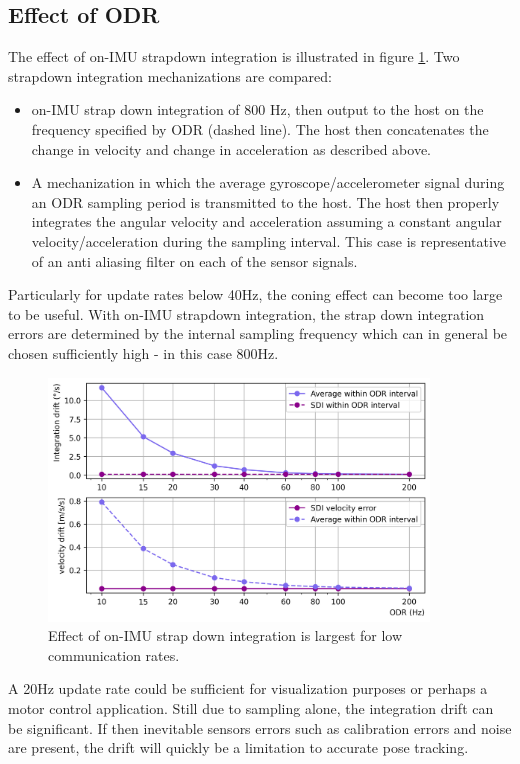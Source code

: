 \documentclass{article}
\begin{document}
\subsection{Effect of ODR}
The effect of on-IMU strapdown integration is illustrated in figure \ref{fig:effect_of_odr}. Two strapdown integration mechanizations are compared:
\begin{itemize}
\item on-IMU strap down integration of 800 Hz, then output to the host on the frequency specified by ODR (dashed line). The host then concatenates the change in velocity and change in acceleration as described above.
\item A mechanization in which the average gyroscope/accelerometer signal during an ODR sampling period is transmitted to the host. The host then properly integrates the angular velocity and acceleration assuming a constant angular velocity/acceleration during the sampling interval. This case is representative of an anti aliasing filter on each of the sensor signals.
\end{itemize}

Particularly for update rates below 40Hz, the coning effect can become too large to be useful. With on-IMU strapdown integration, the strap down integration errors are determined by the internal sampling frequency which can  in general be chosen sufficiently high - in this case 800Hz.

\begin{figure}[ht]
\centering
\includegraphics[width=0.9\textwidth]{drift_versus_odr_frequency.png} 
\caption{Effect of on-IMU strap down integration is largest for low communication rates.}
\label{fig:effect_of_odr}
\end{figure}

A 20Hz update rate could be sufficient for visualization purposes or perhaps a motor control application. Still due to sampling alone, the integration drift can be significant. If then inevitable sensors errors such as calibration errors and noise are present, the drift will quickly be a limitation to accurate pose tracking.


\printbibliography
\end{document}
